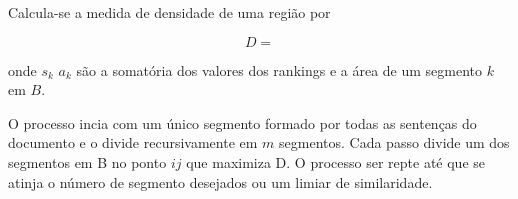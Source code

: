 \documentclass[10pt,a4paper]{article}
\begin{document}
Calcula-se a medida de densidade de uma região por 

\begin{equation}
D = 
\end{equation}


onde $s_k$  $a_k$ são a somatória dos valores dos rankings e a área de um segmento $k$ em $B$.

O processo incia com um único segmento formado por todas as sentenças do documento e o divide recursivamente em $m$ segmentos. Cada passo divide um dos segmentos em B no ponto $ij$ que maximiza D. O processo ser repte até que se atinja o número de segmento desejados ou um limiar de similaridade.
 



\end{document}
